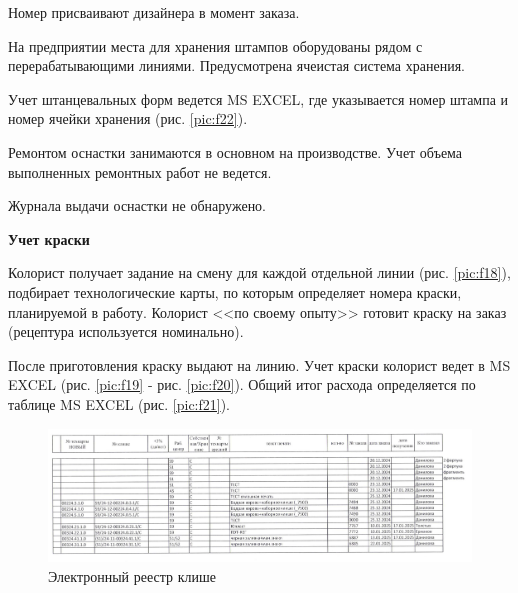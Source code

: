 Номер присваивают дизайнера в момент заказа.

На предприятии места для хранения штампов оборудованы рядом с перерабатывающими линиями. Предусмотрена ячеистая система хранения. 

Учет штанцевальных форм ведется MS EXCEL, где указывается номер штампа и номер ячейки хранения (рис. \ref{pic:f22}).

Ремонтом оснастки занимаются в основном на производстве. Учет объема выполненных ремонтных работ не ведется.


Журнала выдачи оснастки не обнаружено.












\textbf{Учет краски}

Колорист получает задание на смену для каждой отдельной линии (рис. \ref{pic:f18}), подбирает технологические карты, по которым определяет номера краски, планируемой в работу. Колорист <<по своему опыту>> готовит краску на заказ (рецептура используется номинально). 

После приготовления краску выдают на линию. Учет краски колорист ведет в MS EXCEL (рис. \ref{pic:f19} - рис. \ref{pic:f20}). Общий итог расхода определяется по таблице MS EXCEL (рис. \ref{pic:f21}).

\begin{figure}
\begin{center}
 \includegraphics[width=\linewidth, height=0.94\textheight, angle=90, keepaspectratio]{Pics/f17.jpg}
\end{center}
\caption{Электронный реестр клише}
\label{pic:f17}
\end{figure}

